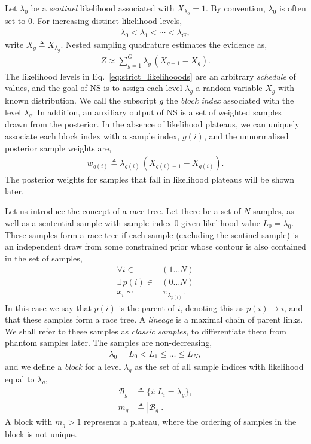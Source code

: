 \documentclass[pdflatex,sn-basic,icol]{sn-jnl}
\theoremstyle{plain}
\theoremstyle{definition}
\begin{document}
Let $\lambda_0$ be a \textit{sentinel} likelihood associated with $X_{\lambda_0}=1$.
By convention, $\lambda_0$ is often set to $0$.
For increasing distinct likelihood levels,
\begin{align}
    \lambda_0 < \lambda_1 < \cdots < \lambda_G,\label{eq:strict_likelihooods}
\end{align}
write $X_g\triangleq X_{\lambda_g}$.
Nested sampling quadrature estimates the evidence as,
\begin{align}
    Z \approx \sum_{g=1}^{G} \lambda_g\,(X_{g-1}-X_g).
    \label{eq:block_quadrature}
\end{align}
The likelihood levels in Eq.~\ref{eq:strict_likelihooods} are an arbitrary \textit{schedule} of values, and the goal of NS is to assign each level $\lambda_g$ a random variable $X_g$ with known distribution.
We call the subscript $g$ the \textit{block index} associated with the level $\lambda_g$.
In addition, an auxiliary output of NS is a set of weighted samples drawn from the posterior.
In the absence of likelihood plateaus, we can uniquely associate each block index with a sample index, $g(i)$, and the unnormalised posterior sample weights are,
\begin{align}
    w_{g(i)} \triangleq \lambda_{g(i)}\, (X_{{g(i)}-1}-X_{g(i)}).\label{eq:post_weight_cont}
\end{align}
The posterior weights for samples that fall in likelihood plateaus will be shown later.

Let us introduce the concept of a race tree.
Let there be a set of $N$ samples, as well as a sentential sample with sample index $0$ given likelihood value $L_0 = \lambda_0$.
These samples form a race tree if each sample (excluding the sentinel sample) is an independent draw from some constrained prior whose contour is also contained in the set of samples,
\begin{align}
    \forall i \in& (1 \ldots N)\\
    \exists\, p(i) \in& (0 \ldots N) \label{eq:parent_def}\\
    x_i \sim& \,\pi_{\lambda_{p(i)}}.
\end{align}
In this case we say that $p(i)$ is the parent of $i$, denoting this as $p(i) \to i$, and that these samples form a race tree.
A \textit{lineage} is a maximal chain of parent links.
We shall refer to these samples as \textit{classic samples}, to differentiate them from phantom samples later.
The samples are non-decreasing,
\begin{align}
     \lambda_0 = L_0<L_1 \le \ldots \le L_N,
\end{align}
and we define a \textit{block} for a level $\lambda_g$ as the set of all sample indices with likelihood equal to $\lambda_g$,
\begin{align}
    \mathcal{B}_g &\triangleq \{i:L_i=\lambda_g\},
    \label{eq:block_def}\\
    m_g &\triangleq |\mathcal{B}_g|.
\end{align}
A block with $m_g > 1$ represents a plateau, where the ordering of samples in the block is not unique.
\end{document}
